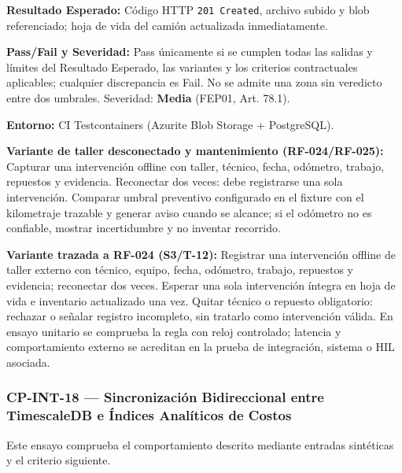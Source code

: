 \par\noindent\textbf{Resultado Esperado:} Código HTTP \texttt{2\allowbreak{}0\allowbreak{}1\allowbreak{} C\allowbreak{}r\allowbreak{}e\allowbreak{}a\allowbreak{}t\allowbreak{}e\allowbreak{}d\allowbreak{}}, archivo subido y blob referenciado; hoja de vida del camión actualizada inmediatamente.\par
\par\noindent\textbf{Pass/Fail y Severidad:} Pass únicamente si se cumplen todas las salidas y límites del Resultado Esperado, las variantes y los criterios contractuales aplicables; cualquier discrepancia es Fail. No se admite una zona sin veredicto entre dos umbrales. Severidad: \textbf{Media} (FEP01, Art. 78.1).\par
\par\noindent\textbf{Entorno:} CI Testcontainers (Azurite Blob Storage + PostgreSQL).\par




\par\noindent\textbf{Variante de taller desconectado y mantenimiento (RF-024/RF-025):} Capturar una intervención offline con taller, técnico, fecha, odómetro, trabajo, repuestos y evidencia. Reconectar dos veces: debe registrarse una sola intervención. Comparar umbral preventivo configurado en el fixture con el kilometraje trazable y generar aviso cuando se alcance; si el odómetro no es confiable, mostrar incertidumbre y no inventar recorrido.\par\par





\par\noindent\textbf{Variante trazada a RF-024 (S3/T-12):} Registrar una intervención offline de taller externo con técnico, equipo, fecha, odómetro, trabajo, repuestos y evidencia; reconectar dos veces. Esperar una sola intervención íntegra en hoja de vida e inventario actualizado una vez. Quitar técnico o repuesto obligatorio: rechazar o señalar registro incompleto, sin tratarlo como intervención válida. En ensayo unitario se comprueba la regla con reloj controlado; latencia y comportamiento externo se acreditan en la prueba de integración, sistema o HIL asociada.\par
\subsubsection*{CP-INT-18 — Sincronización Bidireccional entre TimescaleDB e Índices Analíticos de Costos}\label{sec:9-cp-int-18}
Este ensayo comprueba el comportamiento descrito mediante entradas sintéticas y el criterio siguiente.

